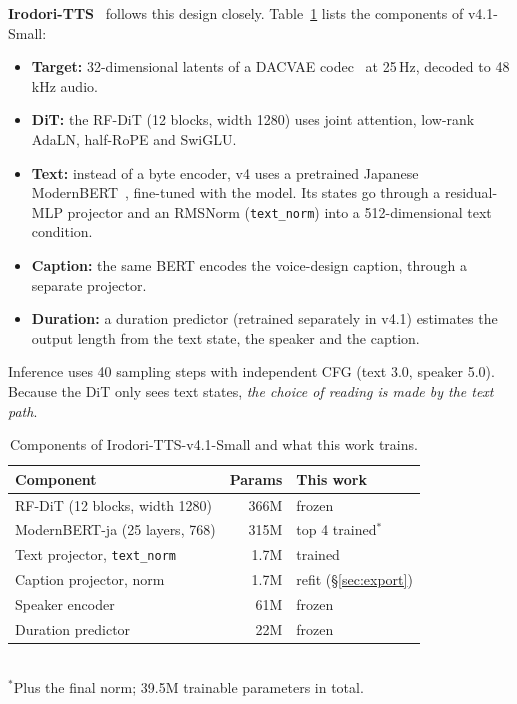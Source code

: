 \documentclass[10pt,a4paper,twocolumn]{article}
\begin{document}
\textbf{Irodori-TTS}~\cite{irodori} follows this design closely. Table~\ref{tab:arch} lists the
components of v4.1-Small:
\begin{itemize}
\item \textbf{Target:} 32-dimensional latents of a DACVAE codec~\cite{dacvae,dac} at 25\,Hz,
  decoded to 48\,kHz audio.
\item \textbf{DiT:} the RF-DiT (12 blocks, width 1280) uses joint attention, low-rank AdaLN,
  half-RoPE and SwiGLU.
\item \textbf{Text:} instead of a byte encoder, v4 uses a pretrained Japanese
  ModernBERT~\cite{modernbert,modernbertja}, fine-tuned with the model. Its
  states go through a residual-MLP projector and an RMSNorm (\texttt{text\_norm}) into a
  512-dimensional text condition.
\item \textbf{Caption:} the same BERT encodes the voice-design caption, through a separate
  projector.
\item \textbf{Duration:} a duration predictor (retrained separately in v4.1) estimates the
  output length from the text state, the speaker and the caption.
\end{itemize}
Inference uses 40 sampling steps with independent CFG (text 3.0, speaker 5.0).
Because the DiT only sees text states, \emph{the choice of reading is made by the text path}.

\begin{table}[t]
\centering\footnotesize\setlength{\tabcolsep}{4pt}
\caption{Components of Irodori-TTS-v4.1-Small and what this work trains.}
\label{tab:arch}
\begin{tabular}{@{}lrl@{}}
\toprule
Component & Params & This work\\
\midrule
RF-DiT (12 blocks, width 1280) & 366M & frozen\\
ModernBERT-ja (25 layers, 768) & 315M & top 4 trained$^\ast$\\
Text projector, \texttt{text\_norm} & 1.7M & trained\\
Caption projector, norm & 1.7M & refit (\S\ref{sec:export})\\
Speaker encoder & 61M & frozen\\
Duration predictor & 22M & frozen\\
\bottomrule
\end{tabular}\\[2pt]
{\footnotesize $^\ast$Plus the final norm; 39.5M trainable parameters in total.}
\end{table}
\end{document}
